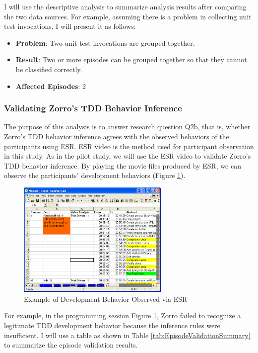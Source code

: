 I will use the descriptive analysis to summarize analysis results
after comparing the two data sources. For example, assuming there is a
problem in collecting unit test invocations, I will present it as
follows:
\begin{itemize}
\item \textbf{Problem}: Two unit test invocations are grouped together.
\item \textbf{Result}: Two or more episodes can be grouped together so 
that they cannot be classified correctly.
\item \textbf{Affected Episodes}: 2
\end{itemize}

\subsubsection{Validating Zorro's TDD Behavior Inference}
The purpose of this analysis is to answer research question Q2b, that
is, whether Zorro's TDD behavior inference agrees with the observed
behaviors of the participants using ESR. ESR video is the method used
for participant observation in this study. As in the pilot study, we
will use the ESR video to validate Zorro's TDD behavior inference. By
playing the movie files produced by ESR, we can observe the
participants' development behaviors (Figure
\ref{fig:VideoZorroComparison}).
\begin{figure}[htbp]
  \centering
  \includegraphics[width=0.65\textwidth]{figs/VideoZorroComparison}
  \caption{Example of Development Behavior Observed via ESR}\label{fig:VideoZorroComparison}
\end{figure}
For example, in the programming session Figure
\ref{fig:VideoZorroComparison}, Zorro failed to recognize a legitimate
TDD development behavior because the inference rules were
insufficient. I will use a table as shown in Table
\ref{tab:EpisodeValidationSummary} to summarize the episode validation results.
